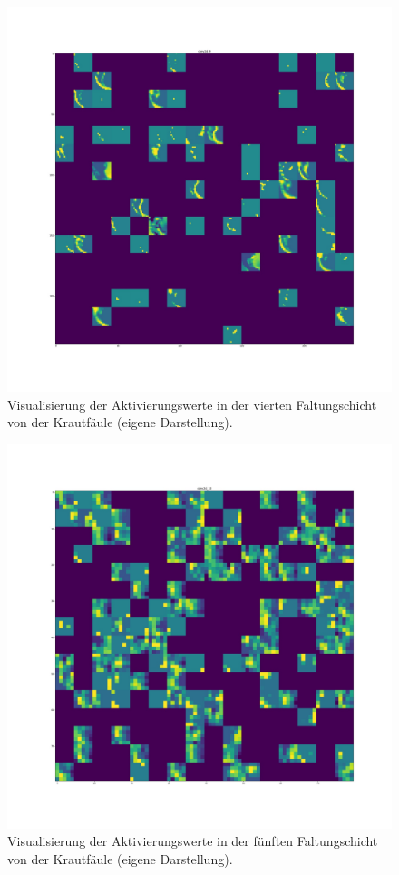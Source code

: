 \begin{figure}[h!]
	\centering
	\includegraphics[width=\textwidth]{visualisierungen/late/activation/late_sample8.JPG}
	\caption{Visualisierung der Aktivierungswerte in der vierten Faltungschicht von der Krautfäule (eigene Darstellung).}
	\label{}
\end{figure}

\begin{figure}[h!]
	\centering
	\includegraphics[width=\textwidth]{visualisierungen/late/activation/late_sample10.JPG}
	\caption{Visualisierung der Aktivierungswerte in der fünften Faltungschicht von der Krautfäule (eigene Darstellung).}
	\label{}
\end{figure}

